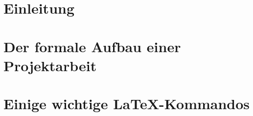 %
%
\seInhaltsverzeichnis[%
einrueckung=ja,
gliederungsebenen=4
]




%
\chapter{Einleitung}


%
%
%
\chapter{Der formale Aufbau einer Projektarbeit}
%
%




% 
%
\seAppendix{}
\chapter{Einige wichtige \LaTeX{}-Kommandos}



%



%
%
%
%
\newpage
\sePrintGlossary{}


%
%
\sePrintBibliography{}

%


%
%


%
%
%


%
%
%
\seEhrenwoertlicheErklaerung{}














